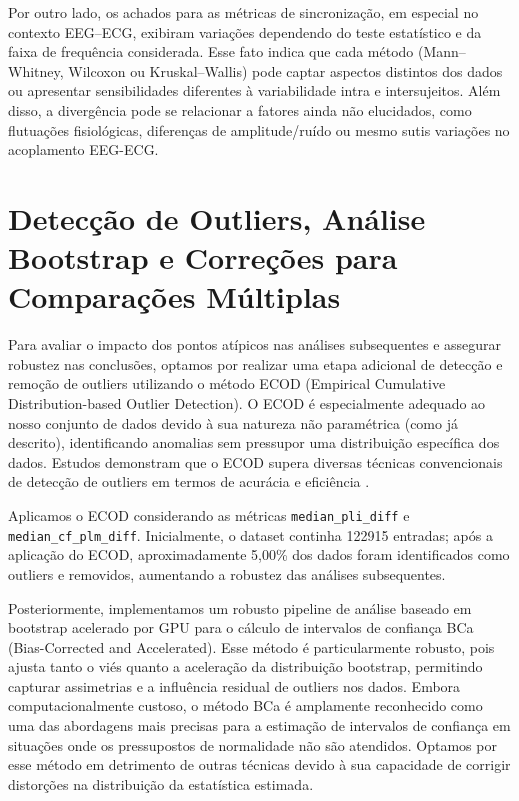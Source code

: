 Por outro lado, os achados para as métricas de sincronização, em especial no contexto EEG–ECG, exibiram variações dependendo do teste estatístico e da faixa de frequência considerada. Esse fato indica que cada método (Mann–Whitney, Wilcoxon ou Kruskal–Wallis) pode captar aspectos distintos dos dados ou apresentar sensibilidades diferentes à variabilidade intra e intersujeitos. Além disso, a divergência pode se relacionar a fatores ainda não elucidados, como flutuações fisiológicas, diferenças de amplitude/ruído ou mesmo sutis variações no acoplamento EEG-ECG.

\section{Detecção de Outliers, Análise Bootstrap e Correções para Comparações Múltiplas}

Para avaliar o impacto dos pontos atípicos nas análises subsequentes e assegurar robustez nas conclusões, optamos por realizar uma etapa adicional de detecção e remoção de outliers utilizando o método ECOD (Empirical Cumulative Distribution-based Outlier Detection). O ECOD é especialmente adequado ao nosso conjunto de dados devido à sua natureza não paramétrica (como já descrito), identificando anomalias sem pressupor uma distribuição específica dos dados. Estudos demonstram que o ECOD supera diversas técnicas convencionais de detecção de outliers em termos de acurácia e eficiência \cite{li2022ecod}.

Aplicamos o ECOD considerando as métricas \texttt{median\_pli\_diff} e \texttt{median\_cf\_plm\_diff}. Inicialmente, o dataset continha 122915 entradas; após a aplicação do ECOD, aproximadamente 5,00\% dos dados foram identificados como outliers e removidos, aumentando a robustez das análises subsequentes.

Posteriormente, implementamos um robusto pipeline de análise baseado em bootstrap acelerado por GPU para o cálculo de intervalos de confiança BCa (Bias-Corrected and Accelerated). Esse método é particularmente robusto, pois ajusta tanto o viés quanto a aceleração da distribuição bootstrap, permitindo capturar assimetrias e a influência residual de outliers nos dados. Embora computacionalmente custoso, o método BCa é amplamente reconhecido como uma das abordagens mais precisas para a estimação de intervalos de confiança em situações onde os pressupostos de normalidade não são atendidos. Optamos por esse método em detrimento de outras técnicas devido à sua capacidade de corrigir distorções na distribuição da estatística estimada.

